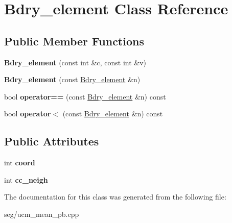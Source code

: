 \hypertarget{class_bdry__element}{\section{Bdry\-\_\-element Class Reference}
\label{class_bdry__element}
}
\subsection*{Public Member Functions}
\begin{DoxyCompactItemize}
\item 
\hypertarget{class_bdry__element_a612b41aebf6a50a9507bef5ebe002604}{{\bfseries Bdry\-\_\-element} (const int \&c, const int \&v)}\label{class_bdry__element_a612b41aebf6a50a9507bef5ebe002604}

\item 
\hypertarget{class_bdry__element_a5ba07ee54a593e73755e5fbd2bb50c38}{{\bfseries Bdry\-\_\-element} (const \hyperlink{class_bdry__element}{Bdry\-\_\-element} \&n)}\label{class_bdry__element_a5ba07ee54a593e73755e5fbd2bb50c38}

\item 
\hypertarget{class_bdry__element_af771f88598557e4f22d1ee96267587e4}{bool {\bfseries operator==} (const \hyperlink{class_bdry__element}{Bdry\-\_\-element} \&n) const }\label{class_bdry__element_af771f88598557e4f22d1ee96267587e4}

\item 
\hypertarget{class_bdry__element_a036edf96df84a91e07cc13fd78f715b5}{bool {\bfseries operator$<$} (const \hyperlink{class_bdry__element}{Bdry\-\_\-element} \&n) const }\label{class_bdry__element_a036edf96df84a91e07cc13fd78f715b5}

\end{DoxyCompactItemize}
\subsection*{Public Attributes}
\begin{DoxyCompactItemize}
\item 
\hypertarget{class_bdry__element_ac820109bd1bc8eaf1f12eb093cee3081}{int {\bfseries coord}}\label{class_bdry__element_ac820109bd1bc8eaf1f12eb093cee3081}

\item 
\hypertarget{class_bdry__element_add846f51d6741ac88c48cccfa9cc5525}{int {\bfseries cc\-\_\-neigh}}\label{class_bdry__element_add846f51d6741ac88c48cccfa9cc5525}

\end{DoxyCompactItemize}


The documentation for this class was generated from the following file\-:\begin{DoxyCompactItemize}
\item 
seg/ucm\-\_\-mean\-\_\-pb.\-cpp\end{DoxyCompactItemize}

